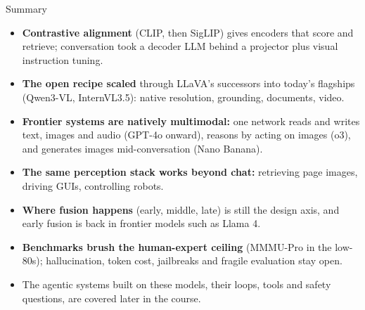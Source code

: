 \begin{frame}{Summary}
  \small
  \begin{itemize}
    \item[\textcolor{red}{$\blacktriangleright$}] \textbf{Contrastive alignment} (CLIP, then SigLIP) gives
      encoders that score and retrieve; conversation took a decoder LLM behind a projector plus visual
      instruction tuning.
    \item[\textcolor{red}{$\blacktriangleright$}] \textbf{The open recipe scaled} through LLaVA's successors
      into today's flagships (Qwen3-VL, InternVL3.5): native resolution, grounding, documents, video.
    \item[\textcolor{red}{$\blacktriangleright$}] \textbf{Frontier systems are natively multimodal:} one
      network reads and writes text, images and audio (GPT-4o onward), reasons by acting on images (o3),
      and generates images mid-conversation (Nano Banana).
    \item[\textcolor{red}{$\blacktriangleright$}] \textbf{The same perception stack works beyond chat:}
      retrieving page images, driving GUIs, controlling robots.
    \item[\textcolor{red}{$\blacktriangleright$}] \textbf{Where fusion happens} (early, middle, late) is
      still the design axis, and early fusion is back in frontier models such as Llama 4.
    \item[\textcolor{red}{$\blacktriangleright$}] \textbf{Benchmarks brush the human-expert ceiling}
      (MMMU-Pro in the low-80s); hallucination, token cost, jailbreaks and fragile evaluation stay open.
    \item[\textcolor{red}{$\blacktriangleright$}] The agentic systems built on these models, their loops,
      tools and safety questions, are covered later in the course.
  \end{itemize}
\end{frame}
